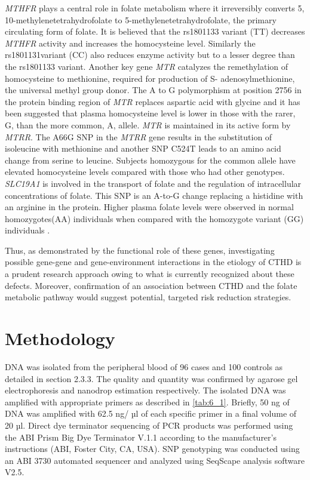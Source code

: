 \begin{refsection}
\begin{sloppypar}\textit{MTHFR} plays a central role in folate metabolism where it irreversibly converts 5, 10-methylenetetrahydrofolate to 5-methylenetetrahydrofolate, the primary circulating form of folate. It is believed that the rs1801133 variant (TT) decreases \textit{MTHFR} activity and increases the homocysteine level. Similarly the rs1801131variant (CC) also reduces enzyme activity but to a lesser degree than the rs1801133 variant. Another key gene \textit{MTR} catalyzes the remethylation of homocysteine to methionine, required for production of S- adenosylmethionine, the universal methyl group donor. The A to G polymorphism at position 2756 in the protein binding region of \textit{MTR} replaces aspartic acid with glycine and it has been suggested that plasma homocysteine level is lower in those with the rarer, G, than the more common, A, allele. \textit{MTR} is maintained in its active form by \textit{MTRR}. The A66G SNP in the \textit{MTRR} gene results in the substitution of isoleucine with methionine and another SNP C524T leads to an amino acid change from serine to leucine. Subjects homozygous for the common allele have elevated homocysteine levels compared with those who had other genotypes. \textit{SLC19A1} is involved in the transport of folate and the regulation of intracellular concentrations of folate. This SNP is an A-to-G change replacing a histidine with an arginine in the protein. Higher plasma folate levels were observed in normal homozygotes(AA) individuals when compared with  the homozygote variant (GG) individuals \cite{bailey2009folate}.\end{sloppypar}

Thus, as demonstrated by the functional role of these genes, investigating possible gene-gene and gene-environment interactions in the etiology of CTHD is a prudent research approach owing to what is currently recognized about these defects. Moreover, confirmation of an association between CTHD and the folate metabolic pathway would suggest potential, targeted risk reduction strategies. 

\section{Methodology}

DNA was isolated from the peripheral blood of 96 cases and 100 controls as detailed in section 2.3.3. The quality and quantity was confirmed by agarose gel electrophoresis and nanodrop estimation respectively. The isolated DNA was amplified with appropriate primers as described in \cref{tab:6_1}. Briefly, 50 ng of DNA was amplified with 62.5 ng/ µl of each specific primer in a final volume of 20 µl. Direct dye terminator sequencing of PCR products was performed using the ABI Prism Big Dye Terminator V.1.1 according to the manufacturer’s instructions (ABI, Foster City, CA, USA). SNP genotyping was conducted using an ABI 3730 automated sequencer and analyzed using SeqScape analysis software V2.5.


\end{refsection}
